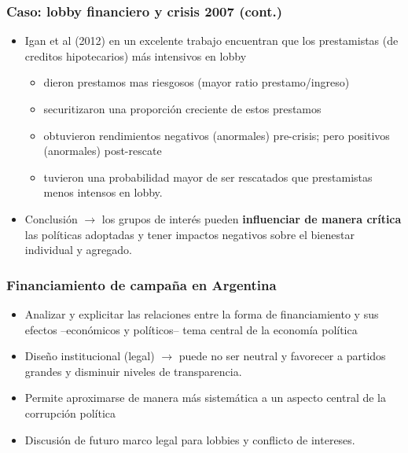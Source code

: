 \documentclass[handout,final,xcolor=dvipsnames]{beamer}
\begin{document}
\begin{frame}\frametitle{Caso: lobby financiero y crisis 2007 (cont.)}
\begin{itemize}\itemsep 15pt
\item Igan et al (2012) en un excelente trabajo encuentran que los
  prestamistas (de creditos hipotecarios) más intensivos en lobby
\begin{itemize}\itemsep 5pt \meskip
\item dieron prestamos mas riesgosos (mayor ratio prestamo/ingreso)
\item securitizaron una proporción creciente de estos prestamos
\item obtuvieron rendimientos negativos (anormales) pre-crisis; pero
  positivos (anormales)
  post-rescate
\item tuvieron una probabilidad mayor de ser rescatados que
  prestamistas menos intensos en lobby. 
\end{itemize}
\item Conclusión $\longrightarrow$ los grupos de interés pueden
  \textbf{influenciar de manera crítica} las políticas adoptadas y
  tener impactos negativos sobre el bienestar individual y agregado. 
\end{itemize}
\end{frame}






\begin{frame}\frametitle{Financiamiento de campaña en Argentina}
\begin{itemize}\itemsep 15pt
\item Analizar y explicitar las relaciones entre la forma de
  financiamiento y sus efectos --económicos y políticos-- tema central
  de la economía política
\item Diseño institucional (legal) $\longrightarrow$ puede no ser neutral y
  favorecer a partidos grandes y disminuir niveles de transparencia.
\item Permite aproximarse de manera más sistemática a un aspecto
  central de la corrupción política
\item Discusión de futuro marco legal para lobbies y conflicto de
  intereses. 
\end{itemize}
\end{frame}
\end{document}
